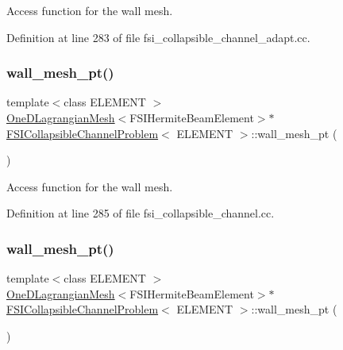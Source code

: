 Access function for the wall mesh. 



Definition at line 283 of file fsi\+\_\+collapsible\+\_\+channel\+\_\+adapt.\+cc.

\mbox{\label{classFSICollapsibleChannelProblem_ae8b71da8da82f3c52387052ce400b930}} 
\subsubsection{\texorpdfstring{wall\+\_\+mesh\+\_\+pt()}{wall\_mesh\_pt()}\hspace{0.1cm}{\footnotesize\ttfamily [2/4]}}
{\footnotesize\ttfamily template$<$class E\+L\+E\+M\+E\+NT $>$ \\
\hyperlink{classoomph_1_1OneDLagrangianMesh}{One\+D\+Lagrangian\+Mesh}$<$F\+S\+I\+Hermite\+Beam\+Element$>$$\ast$ \hyperlink{classFSICollapsibleChannelProblem}{F\+S\+I\+Collapsible\+Channel\+Problem}$<$ E\+L\+E\+M\+E\+NT $>$\+::wall\+\_\+mesh\+\_\+pt (\begin{DoxyParamCaption}{ }\end{DoxyParamCaption})\hspace{0.3cm}{\ttfamily [inline]}}



Access function for the wall mesh. 



Definition at line 285 of file fsi\+\_\+collapsible\+\_\+channel.\+cc.

\mbox{\label{classFSICollapsibleChannelProblem_ae8b71da8da82f3c52387052ce400b930}} 
\subsubsection{\texorpdfstring{wall\+\_\+mesh\+\_\+pt()}{wall\_mesh\_pt()}\hspace{0.1cm}{\footnotesize\ttfamily [3/4]}}
{\footnotesize\ttfamily template$<$class E\+L\+E\+M\+E\+NT $>$ \\
\hyperlink{classoomph_1_1OneDLagrangianMesh}{One\+D\+Lagrangian\+Mesh}$<$F\+S\+I\+Hermite\+Beam\+Element$>$$\ast$ \hyperlink{classFSICollapsibleChannelProblem}{F\+S\+I\+Collapsible\+Channel\+Problem}$<$ E\+L\+E\+M\+E\+NT $>$\+::wall\+\_\+mesh\+\_\+pt (\begin{DoxyParamCaption}{ }\end{DoxyParamCaption})\hspace{0.3cm}{\ttfamily [inline]}}



